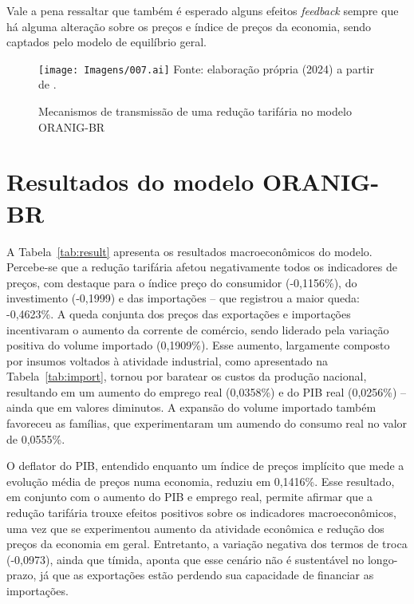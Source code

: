 Vale a pena ressaltar que também é esperado alguns efeitos \textit{feedback} sempre que há alguma alteração sobre os preços e índice de preços da economia, sendo captados pelo modelo de equilíbrio geral.


\begin{figure}[H]
	\centering
	\caption{Mecanismos de transmissão de uma redução tarifária no modelo ORANIG-BR} \label{fig:mecanismos}
	\texttt{[image: Imagens/007.ai]}
	\footnotesize
	Fonte: elaboração própria (2024) a partir de \textcite{vinicius18}.
\end{figure}



\section{Resultados do modelo ORANIG-BR} \label{sec:resultados}

A Tabela~\ref{tab:result} apresenta os resultados macroeconômicos do modelo. Percebe-se que a redução tarifária afetou negativamente todos os indicadores de preços, com destaque para o índice preço do consumidor (-0,1156\%), do investimento (-0,1999) e das importações -- que registrou a maior queda: -0,4623\%. A queda conjunta dos preços das exportações e importações incentivaram o aumento da corrente de comércio, sendo liderado pela variação positiva do volume importado (0,1909\%). Esse aumento, largamente composto por insumos voltados à atividade industrial, como apresentado na Tabela~\ref{tab:import}, tornou por baratear os custos da produção nacional, resultando em um aumento do emprego real (0,0358\%) e do PIB real (0,0256\%) -- ainda que em valores diminutos. A expansão do volume importado também favoreceu as famílias, que experimentaram um aumendo do consumo real no valor de 0,0555\%.

O deflator do PIB, entendido enquanto um índice de preços implícito que mede a evolução média de preços numa economia, reduziu em 0,1416\%. Esse resultado, em conjunto com o aumento do PIB e emprego real, permite afirmar que a redução tarifária trouxe efeitos positivos sobre os indicadores macroeconômicos, uma vez que se experimentou aumento da atividade econômica e redução dos preços da economia em geral. Entretanto, a variação negativa dos termos de troca (-0,0973), ainda que tímida, aponta que esse cenário não é sustentável no longo-prazo, já que as exportações estão perdendo sua capacidade de financiar as importações. 


